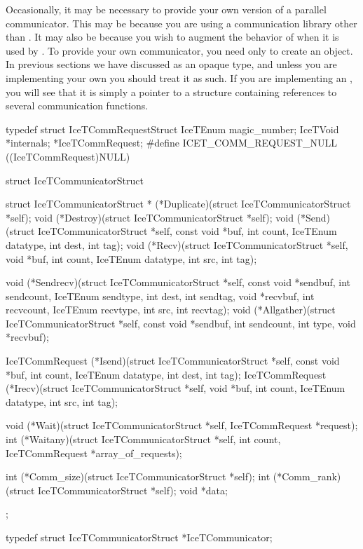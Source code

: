 Occasionally, it may be necessary to provide your own version of a parallel
communicator.  This may be because you are using a communication library
other than \MPI.  It may also be because you wish to augment the behavior
of \MPI when it is used by \IceT.  To provide your own communicator, you
need only to create an  object.  In previous
sections we have discussed  as an opaque type, and
unless you are implementing your own you should treat it as such.  If you
are implementing an , you will see that it is simply
a pointer to a structure containing references to several communication
functions.

\begin{code}
typedef struct IceTCommRequestStruct {
    IceTEnum magic_number;
    IceTVoid *internals;
} *IceTCommRequest;
#define ICET_COMM_REQUEST_NULL ((IceTCommRequest)NULL)

struct IceTCommunicatorStruct {
    struct IceTCommunicatorStruct *
         (*Duplicate)(struct IceTCommunicatorStruct *self);
    void (*Destroy)(struct IceTCommunicatorStruct *self);
    void (*Send)(struct IceTCommunicatorStruct *self,
                 const void *buf, int count, IceTEnum datatype, int dest,
                 int tag);
    void (*Recv)(struct IceTCommunicatorStruct *self,
                 void *buf, int count, IceTEnum datatype, int src, int tag);

    void (*Sendrecv)(struct IceTCommunicatorStruct *self,
                     const void *sendbuf, int sendcount, IceTEnum sendtype,
                     int dest, int sendtag,
                     void *recvbuf, int recvcount, IceTEnum recvtype,
                     int src, int recvtag);
    void (*Allgather)(struct IceTCommunicatorStruct *self,
                      const void *sendbuf, int sendcount, int type,
                      void *recvbuf);

    IceTCommRequest (*Isend)(struct IceTCommunicatorStruct *self,
                             const void *buf, int count, IceTEnum datatype,
                             int dest, int tag);
    IceTCommRequest (*Irecv)(struct IceTCommunicatorStruct *self,
                             void *buf, int count, IceTEnum datatype,
                             int src, int tag);

    void (*Wait)(struct IceTCommunicatorStruct *self, IceTCommRequest *request);
    int  (*Waitany)(struct IceTCommunicatorStruct *self,
                    int count, IceTCommRequest *array_of_requests);

    int  (*Comm_size)(struct IceTCommunicatorStruct *self);
    int  (*Comm_rank)(struct IceTCommunicatorStruct *self);
    void *data;
};

typedef struct IceTCommunicatorStruct *IceTCommunicator;
\end{code}

